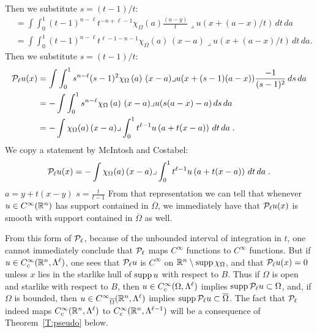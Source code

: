 \documentclass[10pt,a4paper]{article}
\begin{document}
Then we substitute $s = (t-1)/t$:
\begin{align*}
    &= 
    \int \int_{0}^{1} (t-1)^{n-\ell}t^{-n+\ell-1} 
    \chi_{\Omega}\left(a\right)
    \frac{(a-y)}{t} \lrcorner u(x+(a-x)/t) \,dt\,da 
    \\
    &= 
    \int \int_{0}^{1} (t-1)^{n-\ell}t^{\ell-1-n-1} \chi_{\Omega}\left(a\right)\, (x-a)\lrcorner u(x+(a-x)/t) \,dt\,da
    .
\end{align*}
Then we substitute $s = (t-1)/t$:
\begin{align*}
    {\mathcal P}_{\ell} u(x) 
    &= 
    \int \int_{0}^{1} s^{n-\ell} (s-1)^{2} \chi_{\Omega}\left(a\right)\, (x-a)\lrcorner u( x+(s-1)(a-x) ) \frac{-1}{(s-1)^2}\,ds\,da
    \\
    &= 
    - \int \int_{0}^{1} s^{n-\ell} \chi_{\Omega}\left(a\right)\, (x-a)\lrcorner u( s(a-x) - a ) \,ds\,da
    \\
    &=
    - \int \chi_{\Omega}(a) \,(x-a)\lrcorner \int_{0}^{1} t^{\ell-1} u\left(a+t(x-a)\right)\,dt\,da\;
    .
\end{align*}
We copy a statement by McIntosh and Costabel:
\begin{align*}
    {\mathcal P}_{\ell} u(x) 
    = 
    - \int \chi_{\Omega}(a) \,(x-a)\lrcorner \int_{0}^{1} t^{\ell-1} u\left(a+t(x-a)\right)\,dt\,da\;
    .
\end{align*}
$a = y + t(x-y)$
$s = \frac{t}{t-1}$
From that representation we can tell that whenever $u \in C^{\infty}({\mathbb R}^{n})$ has support contained in $\overline\Omega$, we immediately have that ${\mathcal P}_{\ell} u(x)$ is smooth with support contained in $\overline\Omega$ as well. 











From this form of ${\mathcal P}_{\ell}$, because of the unbounded interval of integration in $t$, one cannot immediately conclude that ${\mathcal P}_{\ell}$ maps ${C^\infty}$ functions to ${C^\infty}$ functions.
But if $u\in{C^\infty_c}({\mathbb R}^n,\Lambda^\ell)$, one sees that ${\mathcal P}_{\ell} u$ is ${C^\infty}$ on 
${\mathbb R}^n\setminus\operatorname{supp}\chi_{\Omega}$, and that 
${\mathcal P}_{\ell} u(x)=0$ unless $x$ lies in the starlike hull of $\operatorname{supp} u$ with respect to $B$. 
Thus if $\Omega$ is open and starlike with respect to $B$, then   
$u\in{C^\infty_c}(\Omega,\Lambda^\ell)$ implies $\operatorname{supp} {\mathcal P}_{\ell} u \subset\Omega$, and, if $\Omega$ is bounded, then
$u\in{C^\infty}_{\overline\Omega}({\mathbb R}^n,\Lambda^\ell)$ implies $\operatorname{supp} {\mathcal P}_{\ell} u \subset\overline\Omega$. 
The fact that ${\mathcal P}_{\ell}$ indeed maps 
${C^\infty_c}({\mathbb R}^n,\Lambda^\ell)$ to ${C^\infty_c}({\mathbb R}^n,\Lambda^{\ell-1})$ will be a consequence of Theorem~\ref{T:pseudo} below.
\end{document}
